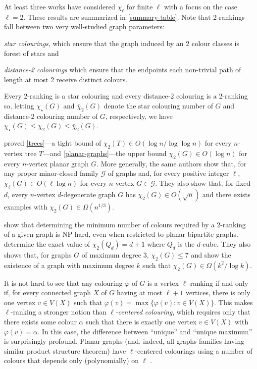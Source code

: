 \documentclass[kpfonts]{patmorin}
\newcommand{\trn}{\chi_2}
\newcommand{\dtcn}{\bar{\chi}_2}
\newcommand{\scn}{\chi_{\star}}
\theoremstyle{named}
\begin{document}
At least three works have considered $\chi_\ell$ for finite $\ell$ with a focus on the case $\ell=2$.  These results are summarized in \cref{summary-table}.  Note that 2-rankings fall between two very well-studied graph parameters:
\begin{compactitem}
    \item \emph{star colourings}, which ensure that the graph induced by an 2 colour classes is forest of stars and
    \item \emph{distance-2 colourings} which ensure that the endpoints each non-trivial path of length at most 2 receive distinct colours.
\end{compactitem}
Every 2-ranking is a star colouring and every distance-2 colouring is a 2-ranking so, letting $\scn(G)$ and $\dtcn(G)$ denote the star colouring number of $G$ and distance-2 colouring number of $G$, respectively, we have $\scn(G) \le \trn(G)\le \dtcn(G)$.

\citet{karpas.neiman.ea:on} proved \cref{trees}---a tight bound of $\trn(T)\in O(\log n/\log\log n)$ for every $n$-vertex tree $T$---and \cref{planar-graphs}---the upper bound $\trn(G)\in O(\log n)$ for every $n$-vertex planar graph $G$.  More generally, the same authors show that, for any proper minor-closed family $\mathcal{G}$ of graphs and, for every positive integer $\ell$, $\chi_\ell(G)\in O(\ell\log n)$ for every $n$-vertex $G\in\mathcal{G}$.  They also show that, for fixed $d$, every $n$-vertex $d$-degenerate graph $G$ has $\trn(G)\in O(\sqrt{n})$ and there exists examples with $\trn(G)\in\Omega(n^{1/3})$.

\citet{shalu.antony:complexity} show that determining the minimum number of colours required by a 2-ranking of a given graph is NP-hard, even when restricted to planar bipartite graphs.  \citet{almeter.demircan.ea:graph} determine the exact value of $\trn(Q_d)=d+1$ where $Q_d$ is the $d$-cube.  They also shows that, for graphs $G$ of maximum degree 3, $\trn(G)\le 7$ and show the existence of a graph with maximum degree $k$ such that $\trn(G)\in\Omega(k^2/\log k)$.

It is not hard to see that any colouring $\varphi$ of $G$ is a vertex $\ell$-ranking if and only if, for every connected graph $X$ of $G$ having at most $\ell+1$ vertices, there is only one vertex $v\in V(X)$ such that $\varphi(v)=\max\{\varphi(v):v\in V(X)\}$.  This makes $\ell$-ranking a stronger notion than \emph{$\ell$-centered colouring}, which requires only that there exists some colour $\alpha$ such that there is exactly one vertex $v\in V(X)$ with $\varphi(v)=\alpha$. In this case, the difference between ``unique'' and ``unique maximum'' is surprisingly profound.  Planar graphs (and, indeed, all graphs families having similar product structure theorem) have $\ell$-centered colourings using a number of colours that depends only (polynomially) on $\ell$ \cite{debski.felsner.ea:improved,pilipczuk.siebertz:polynomial}.
\end{document}
